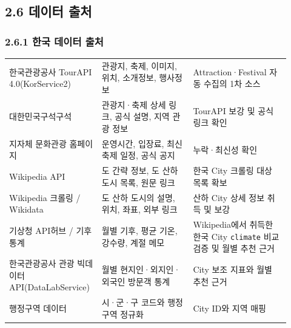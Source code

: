 \documentclass[12pt,a4paper]{article}
\newcommand{\DocNeedspace}[1]{\par\ifdim\dimexpr\pagegoal-\pagetotal\relax<#1\newpage\fi}
\begin{document}
\newpage

\DocNeedspace{24\baselineskip}
\subsection*{2.6 데이터 출처}


\DocNeedspace{5\baselineskip}
\subsubsection*{2.6.1 한국 데이터 출처}


\DocNeedspace{22\baselineskip}
\begin{small}
\begin{longtable}{@{}>{\centering\arraybackslash}m{0.274\linewidth}>{\RaggedRight\arraybackslash}m{0.313\linewidth}>{\RaggedRight\arraybackslash}m{0.333\linewidth}@{}}
\toprule
\multicolumn{1}{>{\centering\arraybackslash}m{0.274\linewidth}}{\textbf{출처}} & \multicolumn{1}{>{\centering\arraybackslash}m{0.313\linewidth}}{\textbf{취득 데이터}} & \multicolumn{1}{>{\centering\arraybackslash}m{0.333\linewidth}}{\textbf{적용 방식}} \\
\midrule
\endhead
한국관광공사 TourAPI 4.0(KorService2) & 관광지, 축제, 이미지, 위치, 소개정보, 행사정보 & Attraction·Festival 자동 수집의 1차 소스 \\
대한민국구석구석 & 관광지·축제 상세 링크, 공식 설명, 지역 관광 정보 & TourAPI 보강 및 공식 링크 확인 \\
지자체 문화관광 홈페이지 & 운영시간, 입장료, 최신 축제 일정, 공식 공지 & 누락·최신성 확인 \\
Wikipedia API & 도 간략 정보, 도 산하 도시 목록, 원문 링크 & 한국 City 크롤링 대상 목록 확보 \\
Wikipedia 크롤링 / Wikidata & 도 산하 도시의 설명, 위치, 좌표, 외부 링크 & 산하 City 상세 정보 취득 및 보강 \\
기상청 API허브 / 기후통계 & 월별 기후, 평균 기온, 강수량, 계절 메모 & Wikipedia에서 취득한 한국 City \texttt{climate} 비교 검증 및 월별 추천 근거 \\
한국관광공사 관광 빅데이터 API\newline (DataLabService) & 월별 현지인·외지인·외국인 방문객 통계 & City 보조 지표와 월별 추천 근거 \\
행정구역 데이터 & 시·군·구 코드와 행정구역 정규화 & City ID와 지역 매핑 \\
\bottomrule
\end{longtable}
\end{small}
\end{document}
